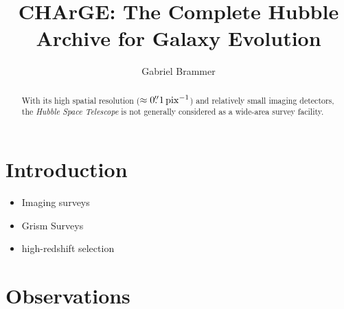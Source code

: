 \documentclass[twocolumn]{aastex63}
\begin{document}
\title{CHArGE: The Complete Hubble Archive for Galaxy Evolution}



\author[0000-0003-2680-005X]{Gabriel Brammer}

\begin{abstract}

With its high spatial resolution ($\approx 0\mbox{$.\!\!^{\prime\prime}$}1\,\mathrm{pix}^{-1}$) and relatively small imaging detectors, the \textit{Hubble Space Telescope} is not generally considered as a wide-area survey facility.

\end{abstract}

\section{Introduction}
\label{s:introduction}

\begin{itemize}
    \item Imaging surveys
    \item Grism Surveys
    \item high-redshift selection
\end{itemize}


\section{Observations}
\label{s:observations}

\end{document}
